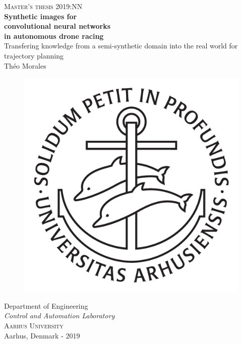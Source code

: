 \newpage
\thispagestyle{empty}
\begin{center}
	\textsc{\large Master's thesis 2019:NN}\\[4cm]		%
	\textbf{\Large Synthetic images for\\convolutional neural
	networks\\[0.2cm]in autonomous drone racing} \\[1cm]
	{\large Transfering knowledge from a semi-synthetic domain into the real
	world for trajectory planning}\\[1cm]
	{\large Théo Morales}
	
	\vfill	
	\begin{figure}[H]
	\centering
	\includegraphics[width=0.2\pdfpagewidth]{figure/auxiliary/ausegl_sort.pdf} \\	
	\end{figure}	\vspace{5mm}	
	
	Department of Engineering\\
	\emph{Control and Automation Laboratory}\\
	\textsc{Aarhus University} \\
	Aarhus, Denmark - 2019\\
\end{center}



